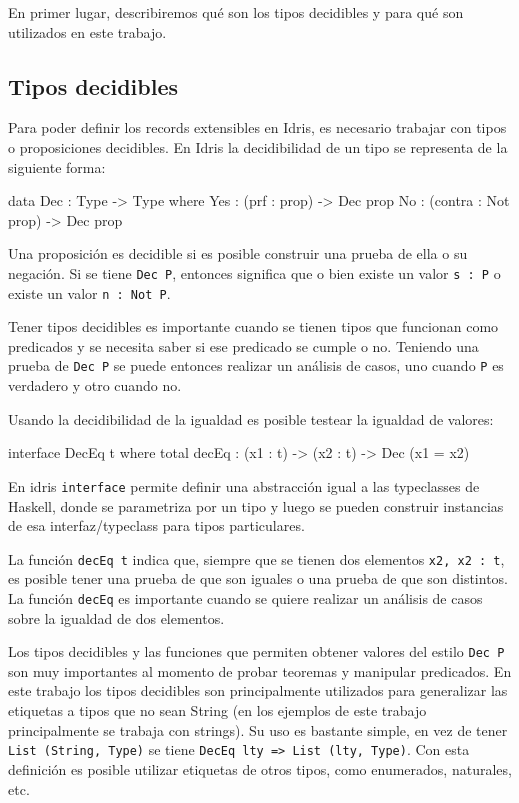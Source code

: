 En primer lugar, describiremos qué son los tipos decidibles y para qué son utilizados en este trabajo.

\subsection{Tipos decidibles}

Para poder definir los records extensibles en Idris, es necesario trabajar con tipos o proposiciones decidibles. En Idris la decidibilidad de un tipo se representa de la siguiente forma:

\begin{code}
data Dec : Type -> Type where
  Yes : (prf : prop) -> Dec prop
  No : (contra : Not prop) -> Dec prop
\end{code}

Una proposición es decidible si es posible construir una prueba de ella o su negación. Si se tiene \texttt{Dec P}, entonces significa que o bien existe un valor \texttt{s : P} o existe un valor \texttt{n : Not P}.

Tener tipos decidibles es importante cuando se tienen tipos que funcionan como predicados y se necesita saber si ese predicado se cumple o no. Teniendo una prueba de \texttt{Dec P} se puede entonces realizar un análisis de casos, uno cuando \texttt{P} es verdadero y otro cuando no.

Usando la decidibilidad de la igualdad es posible testear la igualdad de valores:

\begin{code}
interface DecEq t where
  total decEq : (x1 : t) -> (x2 : t) -> Dec (x1 = x2)
\end{code}

En idris \texttt{interface} permite definir una abstracción igual a las typeclasses de Haskell, donde se parametriza por un tipo y luego se pueden construir instancias de esa interfaz/typeclass para tipos particulares.

La función \texttt{decEq t} indica que, siempre que se tienen dos elementos \texttt{x2, x2 : t}, es posible tener una prueba de que son iguales o una prueba de que son distintos. La función \texttt{decEq} es importante cuando se quiere realizar un análisis de casos sobre la igualdad de dos elementos.

Los tipos decidibles y las funciones que permiten obtener valores del estilo \texttt{Dec P} son muy importantes al momento de probar teoremas y manipular predicados. En este trabajo los tipos decidibles son principalmente utilizados para generalizar las etiquetas a tipos que no sean String (en los ejemplos de este trabajo principalmente se trabaja con strings). Su uso es bastante simple, en vez de tener \texttt{List (String, Type)} se tiene \texttt{DecEq lty => List (lty, Type)}. Con esta definición es posible utilizar etiquetas de otros tipos, como enumerados, naturales, etc.

